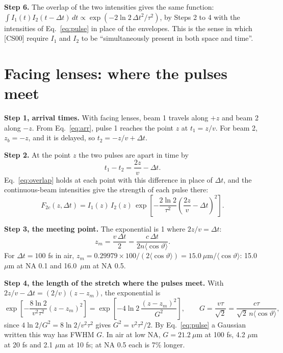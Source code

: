 \documentclass[11pt]{article}
\begin{document}
\textbf{Step 6.} The overlap of the two intensities gives the same function:
$\int I_1(t)I_2(t-\Delta t)\,dt \propto \exp(-2\ln 2\,\Delta t^2/\tau^2)$, by Steps 2 to 4 with the intensities
of Eq.~\ref{eq:pulse} in place of the envelopes. This is the sense in which [CS00] require $I_1$ and $I_2$ to be
``simultaneously present in both space and time''.

\section{Facing lenses: where the pulses meet}
\textbf{Step 1, arrival times.} With facing lenses, beam 1 travels along $+z$ and beam 2 along $-z$. From Eq.~\ref{eq:arr},
pulse 1 reaches the point $z$ at $t_1 = z/v$. For beam 2, $z_b = -z$, and it is delayed, so
$t_2 = -z/v + \Delta t$.

\textbf{Step 2.} At the point $z$ the two pulses are apart in time by
\begin{equation}t_1 - t_2 = \frac{2z}{v} - \Delta t .\end{equation}
Eq.~\ref{eq:overlap} holds at each point with this difference in place of $\Delta t$, and the continuous-beam intensities give
the strength of each pulse there:
\begin{equation}F_{2c}(z,\Delta t) = I_1(z)\,I_2(z)\,
\exp\!\left[-\frac{2\ln 2}{\tau^2}\left(\frac{2z}{v} - \Delta t\right)^2\right] .\label{eq:gate}\end{equation}

\textbf{Step 3, the meeting point.} The exponential is 1 where $2z/v = \Delta t$:
\begin{equation}z_m = \frac{v\,\Delta t}{2} = \frac{c\,\Delta t}{2n\langle\cos\vartheta\rangle} .\end{equation}
For $\Delta t = 100$ fs in air, $z_m = 0.29979\times100/(2\langle\cos\vartheta\rangle) = 15.0\ \mu\mathrm{m}/\langle\cos\vartheta\rangle$:
15.0~$\mu$m at NA 0.1 and 16.0~$\mu$m at NA 0.5.

\textbf{Step 4, the length of the stretch where the pulses meet.} With $2z/v - \Delta t = (2/v)(z - z_m)$, the
exponential is
\begin{equation}\exp\!\left[-\frac{8\ln 2}{v^2\tau^2}(z - z_m)^2\right]
= \exp\!\left[-4\ln 2\,\frac{(z-z_m)^2}{G^2}\right],\qquad G = \frac{v\tau}{\sqrt2} = \frac{c\tau}{\sqrt2\,n\langle\cos\vartheta\rangle} ,\end{equation}
since $4\ln 2/G^2 = 8\ln 2/v^2\tau^2$ gives $G^2 = v^2\tau^2/2$. By Eq.~\ref{eq:pulse} a Gaussian written this way has
FWHM $G$. In air at low NA, $G = 21.2\ \mu$m at 100 fs, 4.2 $\mu$m at 20 fs and 2.1 $\mu$m at 10 fs; at NA 0.5 each
is 7\% longer.
\end{document}
